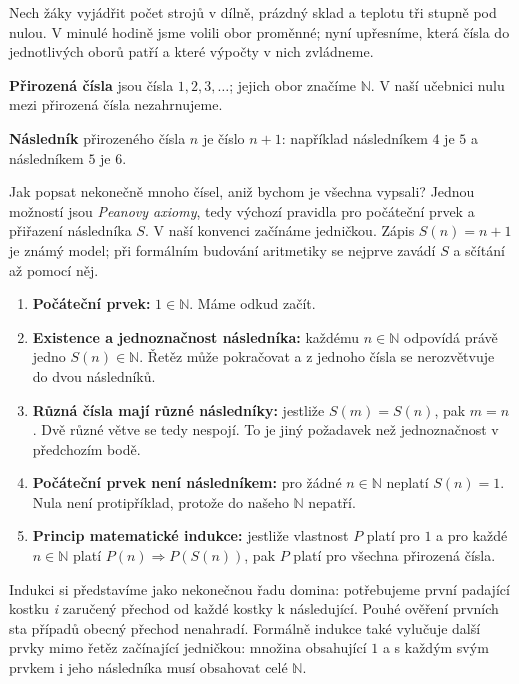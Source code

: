 \documentclass[11pt,a4paper]{article}
\begin{document}

Nech žáky vyjádřit počet strojů v dílně, prázdný sklad a teplotu tři stupně
pod nulou. V minulé hodině jsme volili obor proměnné; nyní upřesníme,
která čísla do jednotlivých oborů patří a které výpočty v nich zvládneme.

\begin{definiceBox}[title={Definice - Přirozená čísla}]
\textbf{Přirozená čísla} jsou čísla $1,2,3,\ldots$; jejich obor značíme
$\mathbb N$. V naší učebnici nulu mezi přirozená čísla nezahrnujeme.
\end{definiceBox}

\begin{definiceBox}[title={Definice - Následník přirozeného čísla}]
\textbf{Následník} přirozeného čísla $n$ je číslo $n+1$:
například následníkem $4$ je $5$ a následníkem $5$ je $6$.
\end{definiceBox}

Jak popsat nekonečně mnoho čísel, aniž bychom je všechna vypsali?
Jednou možností jsou \emph{Peanovy axiomy}, tedy výchozí pravidla
pro počáteční prvek a přiřazení následníka $S$. V naší konvenci začínáme
jedničkou. Zápis $S(n)=n+1$ je známý model; při formálním budování
aritmetiky se nejprve zavádí $S$ a sčítání až pomocí něj.
\begin{enumerate}[label=\arabic*)]
\item \textbf{Počáteční prvek:} $1\in\mathbb N$. Máme odkud začít.
\item \textbf{Existence a jednoznačnost následníka:} každému
$n\in\mathbb N$ odpovídá právě jedno $S(n)\in\mathbb N$.
Řetěz může pokračovat a z jednoho čísla se nerozvětvuje do dvou následníků.
\item \textbf{Různá čísla mají různé následníky:}
jestliže $S(m)=S(n)$, pak $m=n$. Dvě různé větve se tedy nespojí.
To je jiný požadavek než jednoznačnost v předchozím bodě.
\item \textbf{Počáteční prvek není následníkem:}
pro žádné $n\in\mathbb N$ neplatí $S(n)=1$.
Nula není protipříklad, protože do našeho $\mathbb N$ nepatří.
\item \textbf{Princip matematické indukce:} jestliže vlastnost $P$
platí pro $1$ a pro každé $n\in\mathbb N$ platí
$P(n)\Rightarrow P(S(n))$, pak $P$ platí pro všechna přirozená čísla.
\end{enumerate}
Indukci si představíme jako nekonečnou řadu domina: potřebujeme
první padající kostku \emph{i} zaručený přechod od každé kostky k následující.
Pouhé ověření prvních sta případů obecný přechod nenahradí.
Formálně indukce také vylučuje další prvky mimo řetěz začínající jedničkou:
množina obsahující $1$ a s každým svým prvkem i jeho následníka
musí obsahovat celé $\mathbb N$.
\end{document}
